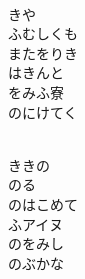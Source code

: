 \documentclass[10pt,b5j]{tarticle} %
\begin{document}
\begin{enumerate}
\begin{minipage}[c]{\blocksize}
        \vspace{\linespace}
        \item~\\
        きや\\
        ふむしくも\\
        またをりき\\
        はきんと\\
        をみふ寮\\
        のにけてく
        
    \end{minipage}
    \begin{minipage}[c]{\blocksize}
        
        \vspace{\linespace}
        \item~\\
        ききの\\
        のる\\
        のはこめて\\
        ふアイヌ\\
        のをみし\\
        のぶかな
    
    \end{minipage}
\end{enumerate} %
\end{document}

